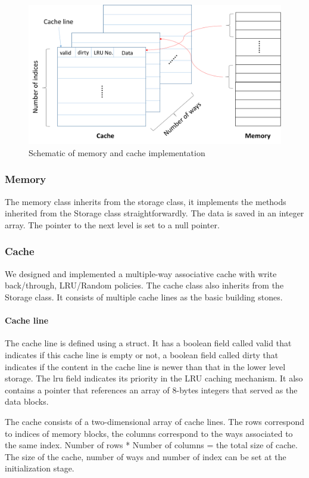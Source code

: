\documentclass{sig-alternate}
\begin{document}
\begin{figure}
\centering
\includegraphics[width = 0.85\linewidth,keepaspectratio]{Cache_and_Memory.png}
\caption{Schematic of memory and cache implementation}
\label{fig:cache_vs_memory}
\end{figure}

\subsubsection{Memory}
The memory class inherits from the storage class, it implements the methods inherited from the Storage class straightforwardly. The data is saved in an integer array. The pointer to the next level is set to a null pointer. 

\subsubsection{Cache}
We designed and implemented a multiple-way associative cache with write back/through, LRU/Random policies. The cache class also inherits from the Storage class. It consists of multiple cache lines as the basic building stones.
\paragraph{Cache line}
 The cache line is defined using a struct. It has a boolean field called valid that indicates if this cache line is empty or not, a boolean field called dirty that indicates if the content in the cache line is newer than that in the lower level storage. The lru field indicates its priority in the LRU caching mechanism. It also contains a pointer that references an array of 8-bytes integers that served as the data blocks.

The cache consists of a two-dimensional array of cache lines. The rows correspond to indices of memory blocks, the columns correspond to the ways associated to the same index. Number of rows * Number of columns = the total size of cache. The size of the cache, number of ways and number of index can be set at the initialization stage.
\end{document}
